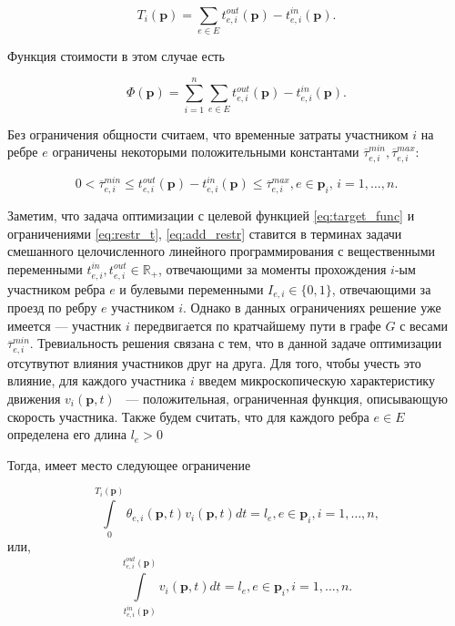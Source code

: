 \documentclass[12pt, a4paper]{article}
\begin{document}
\begin{equation}
	\label{eq:T_i_by_t}
	T_i(\textbf{p}) = \sum \limits_{e \in E} t_{e, i}^{out}(\textbf{p}) - t_{e, i}^{in}(\textbf{p}).
\end{equation}

Функция стоимости в этом случае есть 

\begin{equation}
	\label{eq:target_func}
	\Phi(\textbf{p}) =\sum \limits_{i = 1}^n \sum \limits_{e \in E} t_{e, i}^{out}(\textbf{p}) - t_{e, i}^{in}(\textbf{p}).
\end{equation}

Без ограничения общности считаем, что временные затраты участником $i$ на ребре $e$ ограничены некоторыми положительными константами $\overline{\tau}_{e, i}^{min}, \overline{\tau}_{e, i}^{max}$:

\begin{equation}
	\label{eq:add_restr}
		0 < \overline{\tau}_{e, i}^{min} \le t_{e, i}^{out}(\textbf{p}) - t_{e, i}^{in}(\textbf{p}) \le \overline{\tau}_{e, i}^{max}, e \in \textbf{p}_i,\, i = 1, \dots, n.
\end{equation}

Заметим, что задача оптимизации с целевой функцией \eqref{eq:target_func} и ограничениями \eqref{eq:restr_t}, \eqref{eq:add_restr} ставится в терминах задачи смешанного целочисленного линейного программирования с вещественными переменными $t_{e, i}^{in}, t_{e, i}^{out} \in \mathbb{R}_+$, отвечающими за моменты прохождения $i$-ым участником ребра $e$ и булевыми переменными $I_{e, i} \in \{0, 1\}$, отвечающими за проезд по ребру $e$ участником $i$. Однако в данных ограничениях решение уже имеется --- участник $i$ передвигается по кратчайшему пути в графе $G$ с весами $\overline{\tau}_{e, i}^{min}$. Тревиальность решения связана с тем, что в данной задаче оптимизации отсутвутют влияния участников друг на друга. Для того, чтобы учесть это влияние, для каждого участника $i$ введем микроскопическую характеристику движения $v_i(\textbf{p}, t)$ ~--- положительная, ограниченная функция, описывающую скорость участника. Также будем считать, что для каждого ребра $e \in E$ определена его длина $l_e > 0$

Тогда, имеет место следующее ограничение

\begin{equation}
	\label{eq:velocity_eq_by_theta}
	\int\limits_{0}^{T_i(\textbf{p})} \theta_{e, i} (\textbf{p}, t) v_i(\textbf{p}, t) dt = l_e, e \in \textbf{p}_i, i = 1, \dots, n,
\end{equation}
или,
\begin{equation}
	\label{eq:velocity_eq_by_t}
	\int\limits_{t_{e, i}^{in}(\textbf{p})}^{t_{e, i}^{out}(\textbf{p})} v_i(\textbf{p}, t) dt = l_e, e \in \textbf{p}_i, i = 1, \dots, n.
\end{equation}
\end{document}
